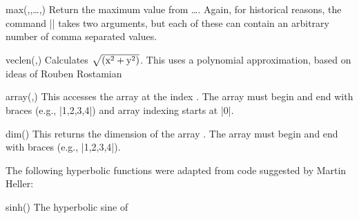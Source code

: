\begin{math-function}{max(,,\ldots,)}
    Return the maximum value from \ldots{}. Again, for
    historical reasons, the command |\pgfmathmax| takes two arguments, but each
    of these can contain an arbitrary number of comma separated values.
\begin{codeexample}[]
 \pgfmathresult
\end{codeexample}
\end{math-function}

\begin{math-function}{veclen(,)}
\mathcommand
    Calculates $\sqrt{\left(\textrm{x}^2+\textrm{y}^2\right)}$.
    This uses a polynomial approximation, based on ideas of Rouben Rostamian
\begin{codeexample}[]
 \pgfmathresult
\end{codeexample}
\end{math-function}

\begin{math-function}{array(,)}
\mathcommand
    This accesses the array  at the index . The array must
    begin and end with braces (e.g., |{1,2,3,4}|) and array indexing starts at
    |0|.
\begin{codeexample}[]
 \pgfmathresult
\end{codeexample}
\end{math-function}

\begin{math-function}{dim()}
\mathcommand
    This returns the dimension of the array . The array must begin and
    end with braces (e.g., |{1,2,3,4}|).
\begin{codeexample}[]
 \pgfmathresult
\end{codeexample}
\end{math-function}

The following hyperbolic functions were adapted from code suggested by Martin
Heller:

\begin{math-function}{sinh()}
\mathcommand
    The hyperbolic sine of 
\begin{codeexample}[]
 \pgfmathresult
\end{codeexample}
\end{math-function}

